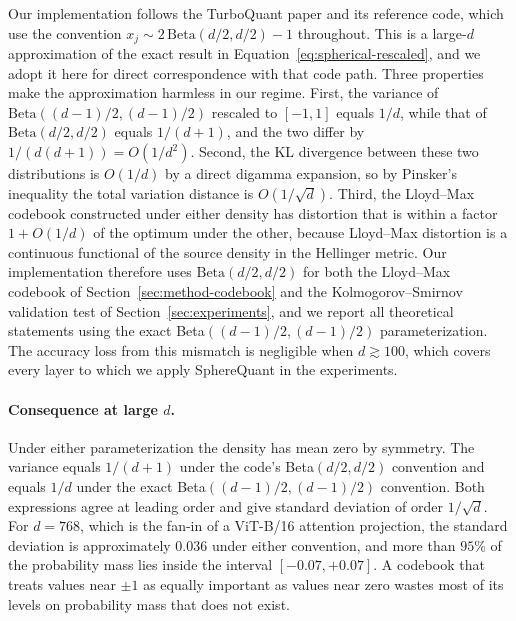 \begin{remark}
\label{rem:asymptotic}
Our implementation follows the TurboQuant paper \citep{turboquant} and its
reference code, which use the convention
$x_j \sim 2\,\mathrm{Beta}(d/2, d/2) - 1$ throughout. This is a large-$d$
approximation of the exact result in Equation~\ref{eq:spherical-rescaled},
and we adopt it here for direct correspondence with that code path. Three
properties make the approximation harmless in our regime. First, the
variance of $\mathrm{Beta}((d-1)/2, (d-1)/2)$ rescaled to $[-1, 1]$ equals
$1/d$, while that of $\mathrm{Beta}(d/2, d/2)$ equals $1/(d+1)$, and the
two differ by $1/(d(d+1)) = O(1/d^2)$. Second, the KL divergence between
these two distributions is $O(1/d)$ by a direct digamma expansion, so by
Pinsker's inequality the total variation distance is $O(1/\sqrt{d})$.
Third, the Lloyd--Max codebook constructed under either density has
distortion that is within a factor $1 + O(1/d)$ of the optimum under the
other, because Lloyd--Max distortion is a continuous functional of the
source density in the Hellinger metric. Our implementation therefore uses
$\mathrm{Beta}(d/2, d/2)$ for both the Lloyd--Max codebook of
Section~\ref{sec:method-codebook} and the Kolmogorov--Smirnov validation
test of Section~\ref{sec:experiments}, and we report all theoretical
statements using the exact Beta$((d-1)/2, (d-1)/2)$ parameterization. The
accuracy loss from this mismatch is negligible when $d \gtrsim 100$, which
covers every layer to which we apply SphereQuant in the experiments.
\end{remark}

\paragraph{Consequence at large $d$.}
Under either parameterization the density has mean zero by symmetry. The
variance equals $1/(d+1)$ under the code's Beta$(d/2, d/2)$ convention and
equals $1/d$ under the exact Beta$((d-1)/2, (d-1)/2)$ convention. Both
expressions agree at leading order and give standard deviation of order
$1/\sqrt{d}$. For $d = 768$, which is the fan-in of a ViT-B/16 attention
projection, the standard deviation is approximately $0.036$ under either
convention, and more than $95\%$ of the probability mass lies inside
the interval $[-0.07, +0.07]$. A codebook that treats values near $\pm 1$ as
equally important as values near zero wastes most of its levels on
probability mass that does not exist.


